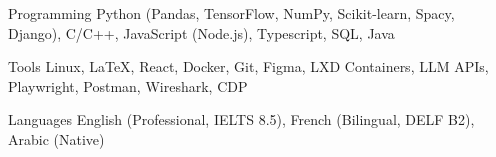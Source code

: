 
\begin{cvskills}

  \cvskill
  {Programming} %
  {Python (Pandas, TensorFlow, NumPy, Scikit-learn, Spacy, Django), C/C++, JavaScript (Node.js), Typescript, SQL, Java} %

  \cvskill
  {Tools} %
  {Linux, \LaTeX, React, Docker, Git, Figma, LXD Containers, LLM APIs, Playwright, Postman, Wireshark, CDP} %

  \cvskill
  {Languages} %
  {English (Professional, IELTS 8.5), French (Bilingual, DELF B2), Arabic (Native)} %

\end{cvskills}
